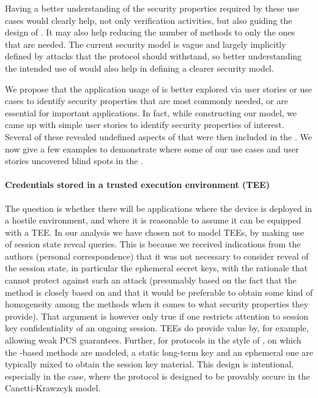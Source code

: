 \documentclass[runningheads,draft,x11names]{llncs}
\begin{document}
Having a better understanding of the security properties required by these use
cases would clearly help, not only verification activities, but also  guiding
the design of \mEdhoc{}.
%
It may also help reducing the number of methods to only the ones that are needed.
%
The current security model is vague and largely implicitly defined by attacks
that the protocol should withstand, so better understanding the intended use of
\mEdhoc{} would also help in defining a clearer security model.
%

We propose that the application usage of \mEdhoc{} is better explored
via user stories or use cases to identify security properties that are most
commonly needed, or are essential for important applications.
%
In fact, while constructing our model, we came up with simple user stories to
identify security properties of interest.
%
Several of these revealed undefined aspects of \mEdhoc{} that were then included
in the \mSpec.
%
We now give a few examples to demonstrate where some of our use cases and user
stories uncovered blind spots in the \mSpec.
%

\paragraph{Credentials stored in a trusted execution environment (TEE)}
The question is whether there will be applications where the device is
deployed in a hostile environment, and where it is reasonable to assume it can
be equipped with a TEE.
%
In our analysis we have chosen not to model TEEs, by making use of session
state reveal queries.
%
This is because we received indications from the \mSpec{} authors (personal
correspondence) that it was not
necessary to consider reveal of the session state, in particular the ephemeral
secret keys, with the rationale that \mSigma{} cannot protect against such an
attack (presumably based on the fact that the \mSigSig{} method is closely based on
\mSigmaI{} and that it would be preferable to obtain some kind of homogeneity
among the \mEdhoc{} methods when it comes to what security properties they
provide).
%
That argument is however only true if one restricts attention to session key
confidentiality of an ongoing session.
%
TEEs do provide value by, for example, allowing weak PCS guarantees.
%
Further, for protocols in the style of \mOptls{}, on which the \mStat{}-based
methods are modeled, a static long-term
key and an ephemeral one are typically mixed to obtain the session key material.
%
This design is intentional, especially in the \mOptls{} case, where the protocol
is designed to be provably secure in the Canetti-Krawzcyk model.
%
\end{document}
